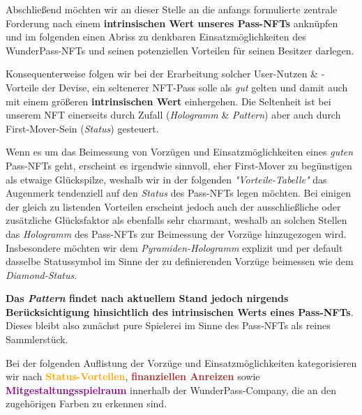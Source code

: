 
Abschließend möchten wir an dieser Stelle an die anfangs formulierte zentrale Forderung nach einem \textbf{intrinsischen Wert unseres Pass-NFTs} anknüpfen und im folgenden einen Abriss zu denkbaren Einsatzmöglichkeiten des WunderPass-NFTs und seinen potenziellen Vorteilen für 
seinen Besitzer darlegen.  

\vspace{0.1cm}

Konsequenterweise folgen wir bei der Erarbeitung solcher User-Nutzen \& -Vorteile der Devise, ein seltenerer NFT-Pass solle als \textit{gut} gelten und damit auch mit einem größeren \textbf{intrinsischen Wert} einhergehen. Die Seltenheit ist bei unserem NFT einerseits durch Zufall (\textit{Hologramm} \& \textit{Pattern}) aber auch durch First-Mover-Sein (\textit{Status}) gesteuert. 

Wenn es um das Beimessung von Vorzügen und Einsatzmöglichkeiten eines \textit{guten} Pass-NFTs geht, erscheint es irgendwie sinnvoll, eher First-Mover zu begünstigen als etwaige Glückspilze, weshalb wir in der folgenden \textit{"Vorteile-Tabelle"} das Augenmerk tendenziell auf den \textit{Status} des Pass-NFTs legen möchten. Bei einigen der gleich \mbox
zu listenden Vorteilen erscheint jedoch auch der ausschließliche oder zusätzliche Glücksfaktor als ebenfalls sehr charmant, weshalb an solchen Stellen das \textit{Hologramm} des Pass-NFTs zur Beimessung der Vorzüge hinzugezogen wird. Insbesondere möchten wir dem \textit{Pyramiden-Hologramm} explizit und per default dasselbe Statussymbol im Sinne der zu definierenden Vorzüge bei\-messen wie dem \textit{Diamond-Status}.

\textbf{Das \textit{Pattern} findet nach aktuellem Stand jedoch nirgends Berücksichtigung hinsichtlich des intrinsischen Werts eines Pass-NFTs}. Dieses bleibt also zunächst pure Spielerei im Sinne des Pass-NFTs als reines Sammlerstück.

\vspace{0.2cm}

Bei der folgenden Auflistung der Vorzüge und Einsatzmöglichkeiten kategorisieren wir nach 
\textcolor{orange}{\textbf{Status-Vorteilen}}, \textcolor{brown}{\textbf{finanziellen Anreizen}} sowie \textcolor{purple}{\textbf{Mitgestaltungsspielraum}} innerhalb der WunderPass-Company, die an den zugehörigen Farben zu erkennen sind.



\vspace{1.0cm}


